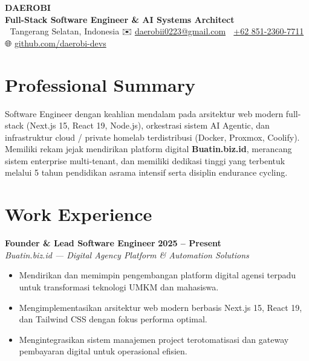 \documentclass[a4paper,10pt]{article}
\begin{document}
\pagestyle{empty}

\begin{center}
    {\Huge\bfseries\color{primary} DAEROBI} \\[3pt]
    {\large\bfseries\color{accent} Full-Stack Software Engineer \& AI Systems Architect} \\[5pt]
    \small\color{subtext}
    📍 Tangerang Selatan, Indonesia \quad \textbar \quad
    ✉️ \href{mailto:daerobii0223@gmail.com}{daerobii0223@gmail.com} \quad \textbar \quad
    📱 \href{https://wa.me/6285123607711}{+62 851-2360-7711} \quad \textbar \quad
    🌐 \href{https://github.com/daerobi-devs}{github.com/daerobi-devs}
\end{center}

\vspace{4pt}

\section{Professional Summary}
Software Engineer dengan keahlian mendalam pada arsitektur web modern full-stack (Next.js 15, React 19, Node.js), orkestrasi sistem AI Agentic, dan infrastruktur cloud / private homelab terdistribusi (Docker, Proxmox, Coolify). Memiliki rekam jejak mendirikan platform digital \textbf{Buatin.biz.id}, merancang sistem enterprise multi-tenant, dan memiliki dedikasi tinggi yang terbentuk melalui 5 tahun pendidikan asrama intensif serta disiplin endurance cycling.

\section{Work Experience}

\textbf{Founder \& Lead Software Engineer} \hfill \color{subtext}\textbf{2025 -- Present}\\
\color{accent}\textit{Buatin.biz.id --- Digital Agency Platform \& Automation Solutions} \color{black}
\begin{itemize}
    \item Mendirikan dan memimpin pengembangan platform digital agensi terpadu untuk transformasi teknologi UMKM dan mahasiswa.
    \item Mengimplementasikan arsitektur web modern berbasis Next.js 15, React 19, dan Tailwind CSS dengan fokus performa optimal.
    \item Mengintegrasikan sistem manajemen project terotomatisasi dan gateway pembayaran digital untuk operasional efisien.
\end{itemize}
\end{document}
